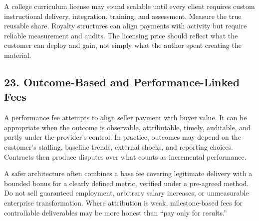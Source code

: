 A college curriculum license may sound scalable until every client requires custom instructional delivery, integration, training, and assessment. Measure the true reusable share. Royalty structures can align payments with activity but require reliable measurement and audits. The licensing price should reflect what the customer can deploy and gain, not simply what the author spent creating the material.

\subsection*{23. Outcome-Based and Performance-Linked Fees}

A performance fee attempts to align seller payment with buyer value. It can be appropriate when the outcome is observable, attributable, timely, auditable, and partly under the provider's control. In practice, outcomes may depend on the customer's staffing, baseline trends, external shocks, and reporting choices. Contracts then produce disputes over what counts as incremental performance.

A safer architecture often combines a base fee covering legitimate delivery with a bounded bonus for a clearly defined metric, verified under a pre-agreed method. Do not sell guaranteed employment, arbitrary salary increases, or unmeasurable enterprise transformation. Where attribution is weak, milestone-based fees for controllable deliverables may be more honest than ``pay only for results.''
